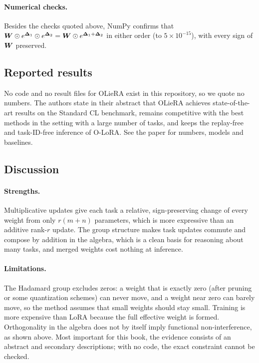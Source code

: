 \paragraph{Numerical checks.} Besides the checks quoted above, NumPy confirms that
$\bm{W}\odot e^{\bm{\Delta}_1}\odot e^{\bm{\Delta}_2} = \bm{W}\odot e^{\bm{\Delta}_1+\bm{\Delta}_2}$ in either order (to
$5\times10^{-15}$), with every sign of $\bm{W}$ preserved.

\subsection{Reported results}\label{sec:c11-ol-results}

\begin{results}
No code and no result files for OLieRA exist in this repository, so we quote no numbers. The
authors state in their abstract that OLieRA achieves state-of-the-art results on the Standard CL
benchmark, remains competitive with the best methods in the setting with a large number of tasks,
and keeps the replay-free and task-ID-free inference of O-LoRA. See
the paper for numbers, models and baselines.
\end{results}

\subsection{Discussion}\label{sec:c11-ol-discussion}

\paragraph{Strengths.} Multiplicative updates give each task a relative, sign-preserving change
of every weight from only $r(m+n)$ parameters, which is more expressive than an additive rank-$r$
update. The group structure makes task updates commute and compose by addition in the algebra,
which is a clean basis for reasoning about many tasks, and merged weights cost nothing at
inference.

\paragraph{Limitations.} The Hadamard group excludes zeros: a weight that is exactly zero (after
pruning or some quantization schemes) can never move, and a weight near zero can barely move, so
the method assumes that small weights should stay small. Training is more expensive than LoRA
because the full effective weight is formed. Orthogonality in the algebra does not by itself
imply functional non-interference, as shown above. Most important for this book, the evidence
consists of an abstract and secondary descriptions; with no code, the exact constraint cannot be
checked.

